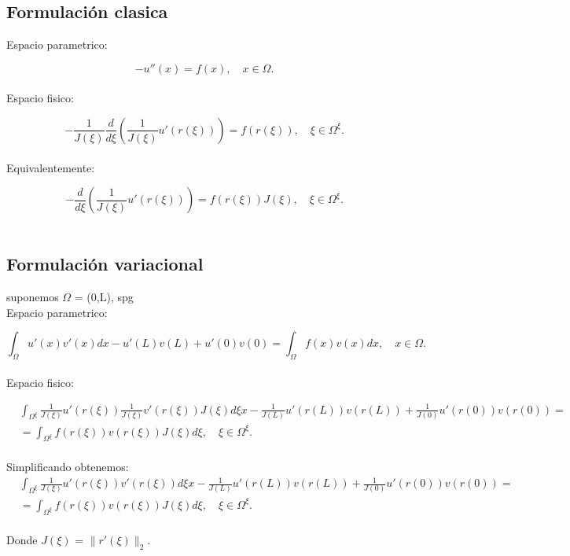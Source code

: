 \documentclass[12pt]{article}
\begin{document}
\subsection{Formulación clasica}

Espacio parametrico:

\begin{equation*}
-u''(x) = f(x), \quad x \in \Omega .
\end{equation*}\\

Espacio fisico:

\begin{equation*}
-\frac{1}{J(\xi)} \frac{d}{d\xi} \left( \frac{1}{J(\xi)} u'(r(\xi)) \right) = f(r(\xi)), \quad \xi \in \Omega^{\xi} .
\end{equation*}\\

Equivalentemente:

\begin{equation*}
-\frac{d}{d\xi} \left( \frac{1}{J(\xi)} u'(r(\xi)) \right) = f(r(\xi))J(\xi), \quad \xi \in \Omega^{\xi} .
\end{equation*}\\


\subsection{Formulación variacional}
suponemos $\Omega$ = (0,L), spg\\
Espacio parametrico:

\begin{equation*}
\int_{\Omega} u'(x)v'(x)dx-u'(L)v(L)+u'(0)v(0) = \int_{\Omega} f(x)v(x)dx, \quad x \in \Omega .
\end{equation*}\\

Espacio fisico:

\begin{align*}
&\int_{\Omega^{\xi}} \frac{1}{J(\xi)} u'(r(\xi)) \frac{1}{J(\xi)} v'(r(\xi)) J(\xi) d\xi x-\frac{1}{J(L)}u'(r(L))v(r(L))+\frac{1}{J(0)}u'(r(0))v(r(0)) =\\
&=\int_{\Omega^{\xi}} f(r(\xi))v(r(\xi)) J(\xi) d\xi, \quad \xi \in \Omega^{\xi} .
\end{align*}\\

Simplificando obtenemos:
\begin{align*}
&\int_{\Omega^{\xi}} \frac{1}{J(\xi)} u'(r(\xi))  v'(r(\xi)) d\xi x-\frac{1}{J(L)}u'(r(L))v(r(L))+\frac{1}{J(0)}u'(r(0))v(r(0)) =\\
&=\int_{\Omega^{\xi}} f(r(\xi))v(r(\xi)) J(\xi) d\xi, \quad \xi \in \Omega^{\xi} .
\end{align*}\\

Donde $J(\xi)$ = $\|r'(\xi)\|_{2}$.
\end{document}
